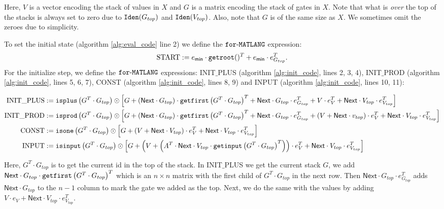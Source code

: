 Here, $V$ is a vector encoding the stack of values in $X$ and $G$ is a matrix encoding the stack of gates in $X$.
Note that what is \textit{over} the top of the stacks is always set to zero due to $\texttt{Iden}(G_{top})$ and $\texttt{Iden}(V_{top})$.
Also, note that $G$ is of the same size as $X$. We sometimes omit the zeroes due to simplicity.

To set the initial state (algorithm \ref{alg:eval_code} line 2) we define the $\texttt{for}\text{-}\texttt{MATLANG}$ expression: $$\text{START}:= e_{\mathsf{min}}\cdot \texttt{getroot}()^T + e_{\mathsf{min}}\cdot e_{G_{top}}^T.$$
For the initialize step, we define the $\texttt{for}\text{-}\texttt{MATLANG}$ expressions: INIT${\_}$PLUS (algorithm \ref{alg:init_code}, lines 2, 3, 4), INIT${\_}$PROD (algorithm \ref{alg:init_code}, lines 5, 6, 7), CONST (algorithm \ref{alg:init_code}, lines 8, 9) and INPUT (algorithm \ref{alg:init_code}, lines 10, 11):

\begin{align*}
	\text{INIT{\_}PLUS} &:= \texttt{isplus}\left( G^T\cdot G_{top} \right)\odot \left[ G + (\mathsf{Next}\cdot G_{top}) \cdot \texttt{getfirst}\left(G^T\cdot G_{top} \right)^T  + \mathsf{Next}\cdot G_{top}\cdot e_{G_{top}}^T +V\cdot e_{V}^T + \mathsf{Next}\cdot V_{top}\cdot e_{V_{top}}^T \right] \\
	\text{INIT{\_}PROD} &:= \texttt{isprod}\left(G^T\cdot G_{top} \right)\odot \left[ G + (\mathsf{Next}\cdot G_{top}) \cdot \texttt{getfirst}\left(G^T\cdot G_{top} \right)^T + \mathsf{Next}\cdot G_{top}\cdot e_{G_{top}}^T +(V + \mathsf{Next}\cdot v_{top})\cdot e_{V}^T + \mathsf{Next}\cdot V_{top}\cdot e_{V_{top}}^T \right] \\
	\text{CONST} &:= \texttt{isone}\left(G^T\cdot G_{top} \right)\odot \left[ G + (V + \mathsf{Next}\cdot V_{top})\cdot e_{V}^T + \mathsf{Next}\cdot V_{top}\cdot e_{V_{top}}^T \right] \\
	\text{INPUT} &:= \texttt{isinput}\left(G^T\cdot G_{top} \right)\odot \left[ G + \left(V + \left( A^T \cdot \mathsf{Next}\cdot V_{top} \cdot \texttt{getinput}\left(G^T\cdot G_{top} \right)^T \right)\right)\cdot e_{V}^T + \mathsf{Next}\cdot V_{top}\cdot e_{V_{top}}^T \right]
\end{align*} 

Here, $G^T\cdot G_{top}$ is to get the current id in the top of the stack. In INIT${\_}$PLUS we get the current stack $G$, we add $\mathsf{Next}\cdot G_{top} \cdot \texttt{getfirst}\left(G^T\cdot G_{top} \right)^T$ which is an $n\times n$ matrix with the first child of $G^T\cdot G_{top}$ in the next row. Then $\mathsf{Next}\cdot G_{top}\cdot e_{G_{top}}^T$ adds $\mathsf{Next}\cdot G_{top}$ to the $n-1$ column to mark the gate we added as the top. Next, we do the same with the values by adding $V\cdot e_{V} + \mathsf{Next}\cdot V_{top}\cdot e_{V_{top}}^T$.

